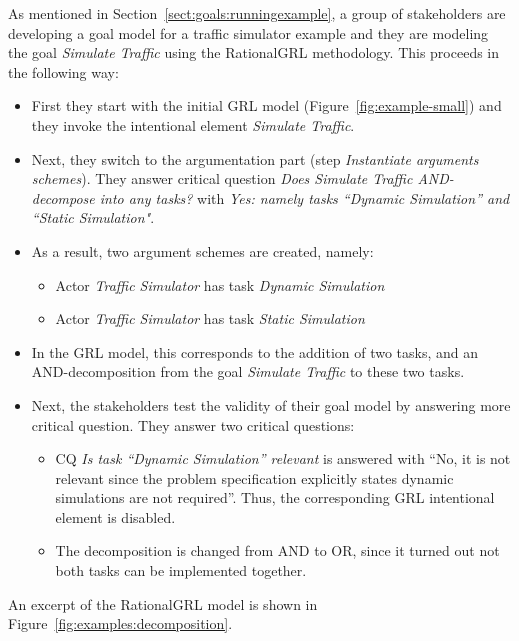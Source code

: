 As mentioned in Section~\ref{sect:goals:runningexample}, a group of stakeholders are developing a goal model for a traffic simulator example and they are modeling the goal \emph{Simulate Traffic} using the RationalGRL methodology. This proceeds in the following way:
\begin{itemize}
\item
First they start %
with the initial GRL model (Figure~\ref{fig:example-small}) and they invoke the intentional element \emph{Simulate Traffic}. 
\item Next, they switch to the argumentation part (step \emph{Instantiate arguments schemes}). They answer critical question \emph{Does Simulate Traffic AND-decompose into any tasks?} with \emph{Yes: namely tasks ``Dynamic Simulation'' and ``Static Simulation"}.
\item As a result, two argument schemes are created, namely:
\begin{itemize}
\item Actor \emph{Traffic Simulator} has task \emph{Dynamic Simulation}
\item Actor \emph{Traffic Simulator} has task \emph{Static Simulation}
\end{itemize}
\item In the GRL model, this corresponds to the addition of two tasks, and an AND-decomposition from the goal \emph{Simulate Traffic} to these two tasks.
\item Next, the stakeholders test the validity of their goal model by answering more critical question. They answer two critical questions:
\begin{itemize}
\item
CQ \emph{Is task ``Dynamic Simulation'' relevant} is answered with ``No, it is not relevant since the problem specification explicitly states dynamic simulations are not required''. Thus, the corresponding GRL intentional element is disabled.
\item The decomposition is changed from AND to OR, since it turned out not both tasks can be implemented together.
\end{itemize}
\end{itemize}

An excerpt of the RationalGRL model is shown in Figure~\ref{fig:examples:decomposition}. %
\fi